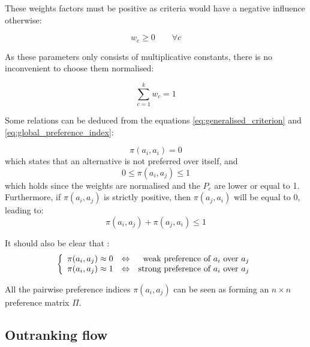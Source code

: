 These weights factors must be positive as criteria would have a negative influence otherwise:

\begin{equation}
    w_c \ge 0 \qquad \forall c
    \label{eqn:wc_positif}
\end{equation}

As these parameters only consists of multiplicative constants, there is no inconvenient to choose them normalised:

\begin{equation}
    \sum\limits^k_{c=1} w_c = 1
    \label{eq:normalised_wc}
\end{equation}

Some relations can be deduced from the equations \eqref{eq:generalised_criterion} and \eqref{eq:global_preference_index}:

\begin{equation}
    \pi(a_i,a_i)=0
    \label{eq:pi_self}
\end{equation}
which states that an alternative is not preferred over itself, and
\begin{equation}
    0 \le \pi(a_i, a_j) \le 1
    \label{eq:pi_bounds}
\end{equation}
which holds since the weights are normalised and the $P_c$ are lower or equal to 1.
Furthermore, if $\pi(a_i, a_j)$ is strictly positive, then $\pi(a_j, a_i)$ will be equal to $0$, leading to:
\begin{equation}
    \pi(a_i, a_j) + \pi(a_j, a_i) \le 1
\end{equation}

It should also be clear that \cite{Brans2016}:
\begin{equation}
    \left \{
        \begin{array}[]{l c r}
            \pi(a_i,a_j) \approx 0 & \Leftrightarrow & \text{weak preference of $a_i$ over $a_j$} \\
            \pi(a_i,a_j) \approx 1 & \Leftrightarrow & \text{strong preference of $a_i$ over $a_j$}
        \end{array}
        \right .
    \label{eq:pi_0_1}
\end{equation}

All the pairwise preference indices $\pi(a_i, a_j)$ can be seen as forming an $n \times n$ preference matrix $\Pi$.

\subsection{Outranking flow} \label{sec:outranking_flow}

